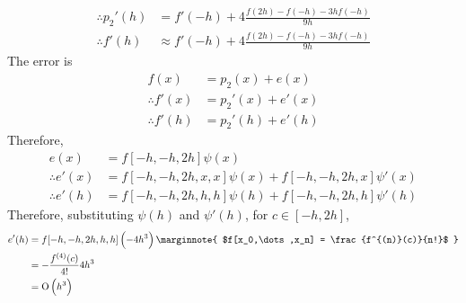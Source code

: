 \documentclass[fleqn, a4paper, 12pt, twoside]{article}
\theoremstyle{definition}
\theoremstyle{theorem}
\begin{document}
\begin{solution}
\begin{enumerate}[leftmargin=*]
\begin{align*}
				\therefore {p_2}'(h) & = f'(-h) + 4 \frac{f(2 h) - f(-h) - 3 h f(-h)}{9 h}            \\
				\therefore f'(h)     & \approx f'(-h) + 4 \frac{f(2 h) - f(-h) - 3 h f(-h)}{9 h}
			\end{align*}
			The error is
			\begin{align*}
				f(x)             & = p_2(x) + e(x)     \\
				\therefore f'(x) & = {p_2}'(x) + e'(x) \\
				\therefore f'(h) & = {p_2}'(h) + e'(h)
			\end{align*}
			Therefore,
			\begin{align*}
				e(x)             & = f[-h,-h,2 h] \psi(x)                               \\
				\therefore e'(x) & = f[-h,-h,2 h,x,x] \psi(x) + f[-h,-h,2 h,x] \psi'(x) \\
				\therefore e'(h) & = f[-h,-h,2 h,h,h] \psi(h) + f[-h,-h,2 h,h] \psi'(h)
			\end{align*}
			Therefore, substituting $\psi(h)$ and $\psi'(h)$, for $c \in [-h,2 h]$,
			\begin{align*}
				e'(h)  & = f[-h,-h,2 h,h,h] \left( -4 h^3 \right)
				\marginnote
				{
					$f[x_0,\dots,x_n] = \frac{f^{(n)}(c)}{n!}$
				}     \\
                                       & = -\frac{f^{(4)}(c)}{4!} 4 h^3 \\
                                       & = \mathrm{O}\left( h^3 \right)
			\end{align*}
	\end{enumerate}
\end{solution}
\end{document}
